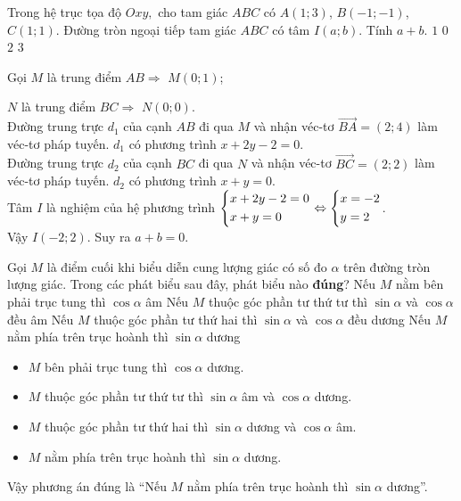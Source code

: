 \begin{ex}%
Trong hệ trục tọa độ $ Oxy, $	cho tam giác $ ABC $ có $ A(1;3) $, $ B(-1;-1) $, $ C(1;1) $. Đường tròn ngoại tiếp tam giác $ ABC $ có tâm $ I(a;b) $. Tính $ a + b. $
	\choice
	{$ 1 $}
	{\True $ 0 $ }
	{$ 2 $}
	{$ 3 $}
	\loigiai
	{Gọi $ M $ là trung điểm $ AB \Rightarrow $ $ M\left(0;1\right) $; 
		
		$ N $ là trung điểm $ BC \Rightarrow $ $ N(0;0) $.
		\\	Đường trung trực $ d_1 $ của cạnh $ AB $ đi qua $ M $ và nhận véc-tơ $ \vec{BA} = (2;4) $ làm véc-tơ pháp tuyến.		
		$ d_1 $ có phương trình $ x + 2y - 2 = 0. $\\
		Đường trung trực $ d_2 $ của cạnh $ BC $ đi qua $ N $ và nhận véc-tơ $ \vec{BC} = (2;2) $ làm véc-tơ pháp tuyến.		
		$ d_2 $ có phương trình $ x + y = 0. $\\		
		Tâm $ I $ là nghiệm của hệ phương trình 
			$ \left\{\begin{aligned}&x + 2y - 2 = 0 \\ & x + y = 0 \end{aligned}\right. \Leftrightarrow \left\{\begin{aligned}& x = -2\\& y = 2\end{aligned}\right. $.
	\\Vậy $ I \left(-2;2\right). $	Suy ra $ a + b = 0. $
	}
\end{ex}
\begin{ex}%
Gọi $ M $	 là điểm cuối khi biểu diễn cung lượng giác có số đo $ \alpha $ trên đường tròn lượng giác. Trong các phát biểu sau đây, phát biểu nào \textbf{đúng}?
	\choice
	{Nếu $ M $ nằm bên phải trục tung thì $ \cos \alpha  $ âm}
	{Nếu $ M $ thuộc góc phần tư thứ tư thì $ \sin \alpha $ và $ \cos \alpha  $ đều âm}
	{Nếu $ M $ thuộc góc phần tư thứ hai thì $ \sin \alpha $ và $ \cos \alpha  $ đều dương }
		{\True Nếu $ M $ nằm phía trên trục hoành thì $ \sin \alpha $ dương}
	\loigiai
	{\begin{itemize}
			\item $ M $ bên phải trục tung thì $ \cos \alpha $ dương.
			\item $ M $ thuộc góc phần tư thứ tư thì $ \sin \alpha $ âm và $ \cos \alpha  $ dương.
			\item $ M $ thuộc góc phần tư thứ hai thì $ \sin \alpha $ dương và $ \cos \alpha  $ âm.
			\item $ M $ nằm phía trên trục hoành thì $ \sin \alpha $ dương.
		\end{itemize}
		Vậy phương án đúng là ``Nếu $ M $ nằm phía trên trục hoành thì $ \sin \alpha $ dương''.
	}
\end{ex}
